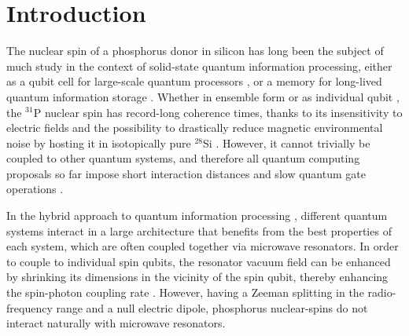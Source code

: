 
\noindent \hrulefill
\clearpage

\normalsize


\section{Introduction}

The nuclear spin of a phosphorus donor in silicon has long been the subject of much study in the context of solid-state quantum information processing, either as a qubit cell for large-scale quantum processors \cite{Kane1998,OGorman2016,Hill2015}, or a memory for long-lived quantum information storage \cite{Morton2008,Freer2017}. Whether in ensemble form \cite{Saeedi2013} or as individual qubit \cite{Muhonen2014}, the $^{31}$P nuclear spin has record-long coherence times, thanks to its insensitivity to electric fields and the possibility to drastically reduce magnetic environmental noise by hosting it in isotopically pure $^{28}$Si \cite{Itoh2014}. However, it cannot trivially be coupled to other quantum systems, and therefore all quantum computing proposals so far impose short interaction distances and slow quantum gate operations \cite{Kane1998,OGorman2016,Hill2015}.

In the hybrid approach to quantum information processing \cite{Xiang2012}, different quantum systems interact in a large architecture that benefits from the best properties of each system, which are often coupled together via microwave resonators. In order to couple to individual spin qubits, the resonator vacuum field can be enhanced by shrinking its dimensions in the vicinity of the spin qubit, thereby enhancing the spin-photon coupling rate \cite{Tosi2017,Jenkins2016,Haikka2017,Sarabi2018}. However, having a Zeeman splitting in the radio-frequency range and a null electric dipole, phosphorus nuclear-spins do not interact naturally with microwave resonators.

